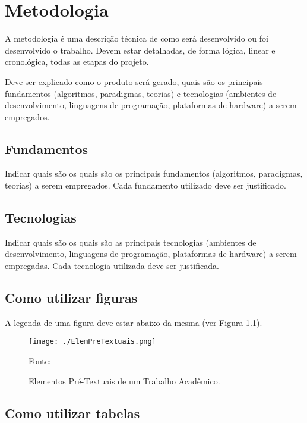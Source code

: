 \chapter{Metodologia}\label{cap:metodologia}

A metodologia é uma descrição técnica de como será desenvolvido ou foi desenvolvido o trabalho. Devem estar detalhadas, de forma lógica, linear e cronológica, todas as etapas do projeto.

Deve ser explicado como o produto será gerado, quais são os principais fundamentos (algoritmos, paradigmas, teorias) e tecnologias (ambientes de desenvolvimento, linguagens de programação, plataformas de hardware) a serem empregados.

\section{Fundamentos}\label{s:fundamentos}
Indicar quais são os quais são os principais fundamentos (algoritmos, paradigmas, teorias) a serem empregados.
Cada fundamento utilizado deve ser justificado.

\section{Tecnologias}\label{s:tecnologias}
Indicar quais são os quais são as principais tecnologias (ambientes de desenvolvimento, linguagens de programação, plataformas de hardware) a serem empregadas. Cada tecnologia utilizada deve ser justificada.

\section{Como utilizar figuras}\label{s:usoFiguras}

A legenda de uma figura deve estar abaixo da mesma (ver Figura \ref{fig:ElemPreTextuais}).

\begin{figure}[h]
\begin{center}
    \texttt{[image: ./ElemPreTextuais.png]}
    \caption{Elementos Pré-Textuais de um Trabalho Acadêmico.}Fonte: \cite{NormasUTFPR}
    \label{fig:ElemPreTextuais}
\end{center}
\end{figure}

\section{Como utilizar tabelas}\label{s:usoTabelas}

